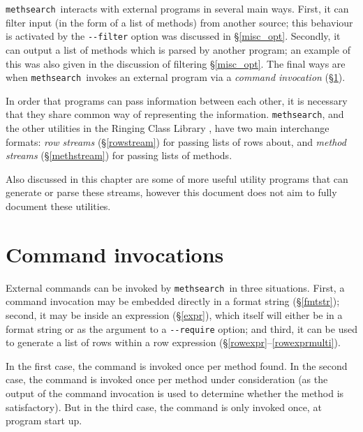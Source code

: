 \documentclass[a4paper,11pt,oneside]{book}
\makeatletter
\newcommand{\loi}[1]{\index{#1@{\hspace*{-\loptwidth}\texttt{--#1}}}}
\def\methsearch{\texttt{meth\-search}}
\newcommand{\sref}[1]{\hyperref[#1]{\S\ref{#1}}}
\makeatother
\begin{document}
\methsearch\ interacts with external programs in several main ways.  First, it
can filter input (in the form of a list of methods) from another source;
this behaviour is activated by the \verb+--filter+\loi{filter} option was 
discussed in \sref{misc_opt}.  Secondly, it can output a list of methods
which is parsed by another program; an example of this was also given in
the discussion of filtering \sref{misc_opt}.  The final ways are when 
\methsearch\ invokes an external program via a \textit{command invocation}
(\sref{cmdinv}).  

In order that programs can pass information between each other, 
it is necessary that they share common way of representing the information.  
\methsearch, and the other utilities in the Ringing Class Library%
, have two main interchange formats:
\textit{row streams} (\sref{rowstream}) 
for passing lists of rows about, and 
\textit{method streams} (\sref{methstream}) 
for passing lists of methods.%

Also discussed in this chapter are some of more useful utility programs
that can generate or parse these streams, however this document does not
aim to fully document these utilities.

\section{Command invocations}\label{cmdinv}

External commands can be invoked by \methsearch\ in three situations.
First, a command invocation may be embedded directly in a format string
(\sref{fmtstr}); second, it may be inside an expression (\sref{expr}),
which itself will either be in a format string or as the argument to a 
\verb+--require+\loi{require} option; and third, it can be used to 
generate a list of rows within a row expression 
(\sref{rowexpr}--\ref{rowexprmulti}).  

In the first case, the command is invoked once per method found.
In the second case, the command is invoked once per method under consideration
(as the output of the command invocation is used to determine whether the
method is satisfactory).  But in the third case, the command is only
invoked once, at program start up.
\end{document}
